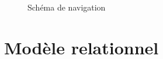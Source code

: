 \documentclass[a4paper,10pt,twoside]{sphinxmanual}
\begin{document}
\begin{figure}[htbp]
\centering
\capstart

\caption{Schéma de navigation}\end{figure}


\chapter{Modèle relationnel}
\label{models:modele-relationnel}\label{models::doc}
\end{document}
